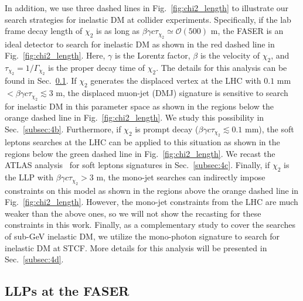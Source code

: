 \documentclass[preprint, superscriptaddress,amsmath, nofootinbib]{revtex4-1}
\begin{document}
In addition, we use three dashed lines in Fig.~\ref{fig:chi2_length} to illustrate our search strategies for inelastic DM at collider experiments. Specifically, if the lab frame decay length of $\chi_2$ is as long as $\beta\gamma c\tau_{\chi_2}\simeq \mathcal{O}(500)$ m, the FASER is an ideal detector to search for inelastic DM as shown in the red dashed line in Fig.~\ref{fig:chi2_length}. Here, $\gamma$ is the Lorentz factor, $\beta$ is the velocity of $\chi_2$, and $\tau_{\chi_2} = 1/\Gamma_{\chi_2}$ is the proper decay time of $\chi_2$. 
The details for this analysis can be found in Sec.~\ref{subsec:4a}. If $\chi_2$ generates the displaced vertex at the LHC with $0.1 $ mm $ < \beta\gamma c\tau_{\chi_2}\lesssim 3$ m, the displaced muon-jet (DMJ) signature is sensitive to search for inelastic DM in this parameter space as shown in the regions below the orange dashed line in Fig.~\ref{fig:chi2_length}. We study this possibility in Sec.~\ref{subsec:4b}. Furthermore, if $\chi_2$ is prompt decay ($\beta\gamma c\tau_{\chi_2}\lesssim 0.1$ mm), the soft leptons searches at the LHC can be applied to this situation as shown in the regions below the green dashed line in Fig.~\ref{fig:chi2_length}. We recast the ATLAS analysis~\cite{ATLAS:2019lng} for soft leptons signatures in Sec.~\ref{subsec:4c}. Finally, if $\chi_2$ is the LLP with $\beta\gamma c\tau_{\chi_2} > 3$ m, the mono-jet searches can indirectly impose constraints on this model as shown in the regions above the orange dashed line in Fig.~\ref{fig:chi2_length}. However, the mono-jet constraints from the LHC are much weaker than the above ones, so we will not show the recasting for these constraints in this work. Finally, as a complementary study to cover the searches of sub-GeV inelastic DM, we utilize the mono-photon signature to search for inelastic DM at STCF. More details for this analysis will be presented in Sec.~\ref{subsec:4d}. 



\subsection{LLPs at the FASER}
\label{subsec:4a}
\end{document}
